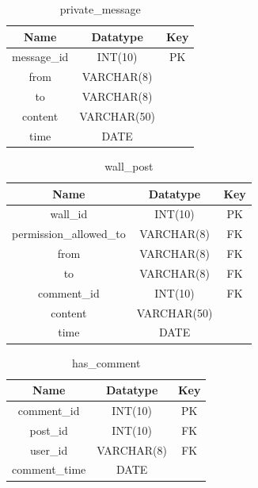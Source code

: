\begin{table}[!ht]
\caption{private\_message}
\centering
\begin{tabular}{c c c}
\hline\hline
Name               & Datatype    & Key \\
\hline
message\_id        & INT(10)     & PK  \\
from               & VARCHAR(8)  &     \\
to                 & VARCHAR(8)  &     \\
content            & VARCHAR(50) &     \\
time               & DATE        &     \\
\hline
\end{tabular}
\label{table:nonlin}
\end{table}

\begin{table}[!ht]
\caption{wall\_post}
\centering
\begin{tabular}{c c c}
\hline\hline
Name                    & Datatype    & Key \\
\hline
wall\_id                & INT(10)     & PK  \\
permission\_allowed\_to & VARCHAR(8)  & FK  \\
from                    & VARCHAR(8)  & FK  \\
to                      & VARCHAR(8)  & FK  \\
comment\_id             & INT(10)     & FK  \\
content                 & VARCHAR(50) &     \\
time                    & DATE        &     \\
\hline
\end{tabular}
\label{table:nonlin}
\end{table}

\begin{table}[!ht]
\caption{has\_comment}
\centering
\begin{tabular}{c c c}
\hline\hline
Name               & Datatype    & Key \\
\hline
comment\_id        & INT(10)     & PK  \\
post\_id           & INT(10)     & FK  \\
user\_id           & VARCHAR(8)  & FK  \\
comment\_time      & DATE        &     \\
\hline
\end{tabular}
\label{table:nonlin}
\end{table}

